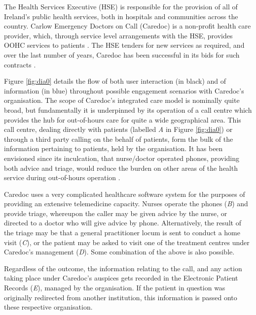 The Health Services Executive (HSE) is responsible for the provision of all of Ireland's public health services, both in hospitals and communities across the country. Carlow Emergency Doctors on Call (Caredoc) is a non-profit health care provider, which, through service level arrangements with the HSE, provides OOHC services to patients \cite{cunniffe2016developing}.  The HSE tenders for new services as required, and over the last number of years, Caredoc has been successful in its bids for such contracts \cite{cunniffe2016developing}. 

Figure \ref{fig:dia0} details the flow of both user interaction (in black) and of information (in blue) throughout possible engagement scenarios with Caredoc's organisation. The scope of Caredoc's integrated care model is nominally quite broad, but fundamentally it is underpinned by its operation of a call centre which provides the hub for out-of-hours care for quite a wide geographical area. This call centre, dealing directly with patients (labelled \textit{A} in Figure \ref{fig:dia0}) or through a third party calling on the behalf of patients, form the bulk of the information pertaining to patients, held by the organisation. It has been envisioned since its inculcation, that nurse/doctor operated phones, providing both advice and triage, would reduce the burden on other areas of the health service during out-of-hours operation \cite{khistriya2010nhs}.




Caredoc uses a very complicated healthcare software system for the purposes of providing an extensive telemedicine capacity. Nurses operate the phones (\textit{B}) and provide triage, whereupon the caller may be given advice by the nurse, or directed to a doctor who will give advice by phone. Alternatively, the result of the triage may be that a general practitioner locum is sent to conduct a home visit (\textit{C}), or the patient may be asked to visit one of the treatment centres under Caredoc's management (\textit{D}). Some combination of the above is also possible.  

Regardless of the outcome, the information relating to the call, and any action taking place under Caredoc's auspices gets recorded in the Electronic Patient Records (\textit{E}), managed by the organisation. If the patient in question was originally redirected from another institution, this information is passed onto these respective organisation. 

